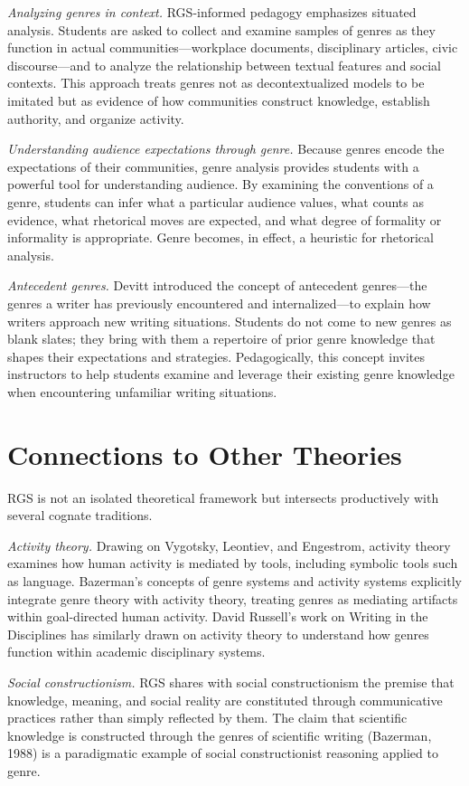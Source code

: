 \documentclass[12pt]{article}
\begin{document}
\textit{Analyzing genres in context.} RGS-informed pedagogy emphasizes situated analysis. Students are asked to collect and examine samples of genres as they function in actual communities---workplace documents, disciplinary articles, civic discourse---and to analyze the relationship between textual features and social contexts. This approach treats genres not as decontextualized models to be imitated but as evidence of how communities construct knowledge, establish authority, and organize activity.

\textit{Understanding audience expectations through genre.} Because genres encode the expectations of their communities, genre analysis provides students with a powerful tool for understanding audience. By examining the conventions of a genre, students can infer what a particular audience values, what counts as evidence, what rhetorical moves are expected, and what degree of formality or informality is appropriate. Genre becomes, in effect, a heuristic for rhetorical analysis.

\textit{Antecedent genres.} Devitt introduced the concept of antecedent genres---the genres a writer has previously encountered and internalized---to explain how writers approach new writing situations. Students do not come to new genres as blank slates; they bring with them a repertoire of prior genre knowledge that shapes their expectations and strategies. Pedagogically, this concept invites instructors to help students examine and leverage their existing genre knowledge when encountering unfamiliar writing situations.

\section{Connections to Other Theories}

RGS is not an isolated theoretical framework but intersects productively with several cognate traditions.

\textit{Activity theory.} Drawing on Vygotsky, Leontiev, and Engestrom, activity theory examines how human activity is mediated by tools, including symbolic tools such as language. Bazerman's concepts of genre systems and activity systems explicitly integrate genre theory with activity theory, treating genres as mediating artifacts within goal-directed human activity. David Russell's work on Writing in the Disciplines has similarly drawn on activity theory to understand how genres function within academic disciplinary systems.

\textit{Social constructionism.} RGS shares with social constructionism the premise that knowledge, meaning, and social reality are constituted through communicative practices rather than simply reflected by them. The claim that scientific knowledge is constructed through the genres of scientific writing (Bazerman, 1988) is a paradigmatic example of social constructionist reasoning applied to genre.
\end{document}
